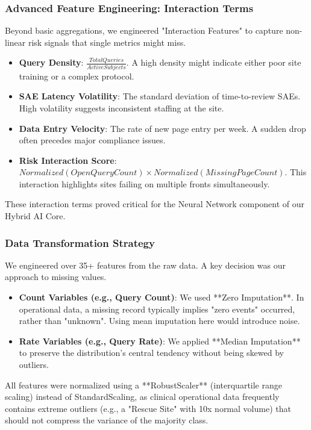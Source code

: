 \documentclass[conference]{IEEEtran}
\begin{document}
\subsubsection{\textbf{Advanced Feature Engineering: Interaction Terms}}
Beyond basic aggregations, we engineered "Interaction Features" to capture non-linear risk signals that single metrics might miss.
\begin{itemize}
    \item \textbf{Query Density}: $\frac{Total Queries}{Active Subjects}$. A high density might indicate either poor site training or a complex protocol.
    \item \textbf{SAE Latency Volatility}: The standard deviation of time-to-review SAEs. High volatility suggests inconsistent staffing at the site.
    \item \textbf{Data Entry Velocity}: The rate of new page entry per week. A sudden drop often precedes major compliance issues.
    \item \textbf{Risk Interaction Score}: $Normalized(Open Query Count) \times Normalized(Missing Page Count)$. This interaction highlights sites failing on multiple fronts simultaneously.
\end{itemize}
These interaction terms proved critical for the Neural Network component of our Hybrid AI Core.

\subsubsection{\textbf{Data Transformation Strategy}}
We engineered over 35+ features from the raw data. A key decision was our approach to missing values.
\begin{itemize}
    \item \textbf{Count Variables (e.g., Query Count)}: We used **Zero Imputation**. In operational data, a missing record typically implies "zero events" occurred, rather than "unknown". Using mean imputation here would introduce noise.
    \item \textbf{Rate Variables (e.g., Query Rate)}: We applied **Median Imputation** to preserve the distribution's central tendency without being skewed by outliers.
\end{itemize}
All features were normalized using a **RobustScaler** (interquartile range scaling) instead of StandardScaling, as clinical operational data frequently contains extreme outliers (e.g., a "Rescue Site" with 10x normal volume) that should not compress the variance of the majority class.
\end{document}
